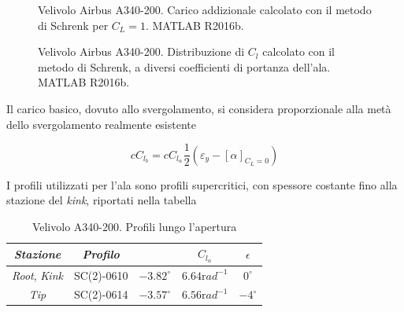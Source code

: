 \begin{figure}[H]
	\centering
	\caption{\footnotesize Velivolo Airbus A340-200. Carico addizionale calcolato con il metodo di Schrenk per $C_L=1$. MATLAB R2016b. }
	\label{fig:V5}
\end{figure}


\begin{figure}[H]
	\centering
	\caption{\footnotesize Velivolo Airbus A340-200. Distribuzione di $C_l$ calcolato con il metodo di Schrenk, a diversi coefficienti di portanza dell'ala. MATLAB R2016b. }
	\label{fig:V6}
\end{figure}

Il carico basico, dovuto allo svergolamento, si considera proporzionale alla metà dello svergolamento realmente esistente

\begin{equation}
\label{eqn:bas}
cC_{l_b}=cC_{l_{\alpha}} \frac{1}{2}(\varepsilon_y-[\alpha]_{C_L=0})
\end{equation}

I profili utilizzati per l’ala sono profili supercritici, con spessore costante fino alla stazione del {\itshape kink}, riportati nella tabella 

\begin{table} [!h]\centering {}
	\begin{tabular}{c  c  c c c }
		\toprule
		\emph{Stazione}& \emph{Profilo}&\alphazl & $C_{l_{\alpha}}$& $\epsilon$ \\ 
		\midrule
		{\itshape Root}, {\itshape Kink}	&	SC(2)-0610	&	$-3.82 ^{\circ}$	& $6.64 {\mathrm rad}^{-1}$	&$0^{\circ}$	\\
		{\itshape Tip} &  SC(2)-0614 &	$-3.57 ^{\circ}$	& $6.56 {\mathrm rad}^{-1}$	&	$-4^{\circ}$	\\
		\bottomrule
	\end{tabular}
	\caption {\footnotesize Velivolo A340-200. Profili lungo l'apertura}
	\label{tabV3}
\end{table}

